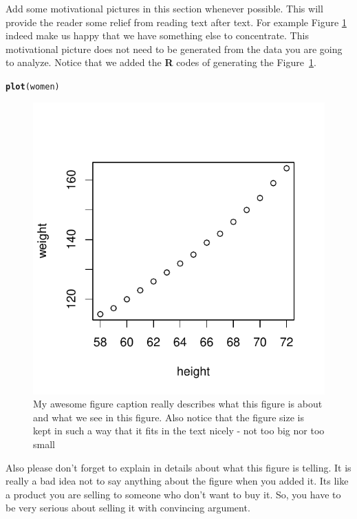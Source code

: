\documentclass{article}\usepackage[]{graphicx}\usepackage[]{color}
\makeatletter
\newcommand{\hlstd}[1]{\textcolor[rgb]{0.345,0.345,0.345}{#1}}%
\newcommand{\hlkwd}[1]{\textcolor[rgb]{0.737,0.353,0.396}{\textbf{#1}}}%
\newenvironment{kframe}{%
 \def\at@end@of@kframe{}%
 \ifinner\ifhmode%
  \def\at@end@of@kframe{\end{minipage}}%
  \begin{minipage}{\columnwidth}%
 \fi\fi%
 \def\FrameCommand##1{\hskip\@totalleftmargin \hskip-\fboxsep
 \colorbox{shadecolor}{##1}\hskip-\fboxsep
     \hskip-\linewidth \hskip-\@totalleftmargin \hskip\columnwidth}%
 \MakeFramed {\advance\hsize-\width
   \@totalleftmargin\z@ \linewidth\hsize
   \@setminipage}}%
 {\par\unskip\endMakeFramed%
 \at@end@of@kframe}
\newenvironment{knitrout}{}{} %
\makeatother
\begin{document}
Add some motivational pictures in this section whenever possible. This will provide the reader some relief from reading text after text. For example Figure \ref{fig:nice-plot} indeed make us happy that we have something else to concentrate. This motivational picture does not need to be generated from the data you are going to analyze. Notice that we added the \textbf{R} codes of generating the Figure~\ref{fig:nice-plot}.


\begin{knitrout}
\color{fgcolor}\begin{kframe}
\begin{alltt}
\hlkwd{plot}\hlstd{(women)}
\end{alltt}
\end{kframe}\begin{figure}[hbtp]

{\centering \includegraphics[width=.45\linewidth]{figure/nice-plot-1} 

}

\caption[My awesome figure caption really describes what this figure is about and what we see in this figure]{My awesome figure caption really describes what this figure is about and what we see in this figure. Also notice that the figure size is kept in such a way that it fits in the text nicely - not too big nor too small}\label{fig:nice-plot}
\end{figure}


\end{knitrout}

Also please don't forget to explain in details about what this figure is telling. It is really a bad idea not to say anything about the figure when you added it. Its like a product you are selling to someone who don't want to buy it. So, you have to be very serious about selling it with convincing argument.
\end{document}
